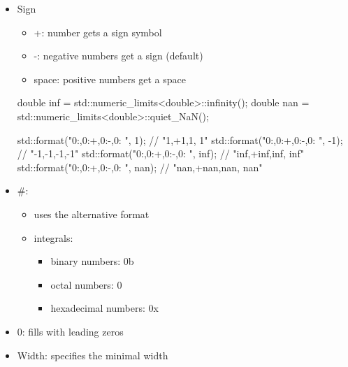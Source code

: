 \begin{itemize}
\item 
Sign

\begin{itemize}
\item 
+: number gets a sign symbol

\item 
-: negative numbers get a sign (default)

\item 
space: positive numbers get a space
\end{itemize}

\begin{cpp}
double inf = std::numeric_limits<double>::infinity();
double nan = std::numeric_limits<double>::quiet_NaN();

std::format("{0:},{0:+},{0:-},{0: }", 1); // "1,+1,1, 1"
std::format("{0:},{0:+},{0:-},{0: }", -1); // "-1,-1,-1,-1"
std::format("{0:},{0:+},{0:-},{0: }", inf); // "inf,+inf,inf, inf"
std::format("{0:},{0:+},{0:-},{0: }", nan); // "nan,+nan,nan, nan"
\end{cpp}

\item 
\#:

\begin{itemize}
\item 
uses the alternative format

\item 
integrals:

\begin{itemize}
\item 
binary numbers: 0b

\item 
octal numbers: 0

\item 
hexadecimal numbers: 0x
\end{itemize}

\end{itemize}

\item 
0: fills with leading zeros


\item 
Width: specifies the minimal width



\end{itemize}
